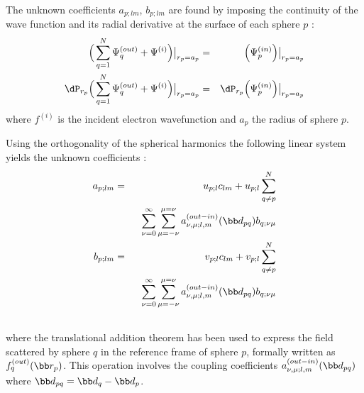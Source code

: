 The unknown coefficients $a_{p;lm}$, $b_{p;lm}$ are found by imposing the
continuity of the wave function and its radial derivative at the surface of each
sphere $p$ :
%
\begin{eqnarray*}
      \Big(\sum_{q=1}^N \Psi_q^{(out)}+\Psi^{(i)}\Big)\big|_{r_p=a_p}
  &=& \Big(\Psi_p^{(in)}\Big)\big|_{r_p=a_p} \\
      \dP_{r_p}\Big(\sum_{q=1}^N \Psi_q^{(out)}+\Psi^{(i)}\Big)\big|_{r_p=a_p}
  &=& \dP_{r_p}\Big(\Psi_p^{(in)}\Big)\big|_{r_p=a_p} \\
\end{eqnarray*}
%
where $f^{(i)}$ is the incident electron wavefunction and $a_p$ the
radius of sphere $p$.

Using the orthogonality of the spherical harmonics
the following linear system yields the unknown coefficients :
%
\begin{eqnarray}
  a_{p;lm} &=& u_{p;l}c_{lm} + u_{p;l}\sum_{q\neq p}^{N} \nonumber\\
    &&~~\sum_{\nu=0}^{\infty}\sum_{\mu=-\nu}^{\mu=\nu}
      a_{\nu,\mu;l,m}^{(out-in)}(\bb d_{pq})b_{q;\nu\mu}\label{eq:aplm}\\
  b_{p;lm} &=& v_{p;l}c_{lm} + v_{p;l} \sum_{q\neq p}^{N}\nonumber\\
    &&~~\sum_{\nu=0}^{\infty}\sum_{\mu=-\nu}^{\mu=\nu}
      a_{\nu,\mu;l,m}^{(out-in)}(\bb d_{pq})b_{q;\nu\mu}\label{eq:bplm}\\\nonumber
\end{eqnarray}
%
where
the translational addition theorem\cite{Dufva2008} has been
used to express the field scattered by sphere $q$ in the reference
frame of sphere $p$, formally written as $f_q^{(out)}(\bb r_p)$.
This operation involves the coupling coefficients
$a_{\nu,\mu;l,m}^{(out-in)}(\bb d_{pq})$
where $\bb d_{pq}=\bb d_q-\bb d_p$.
%
%

